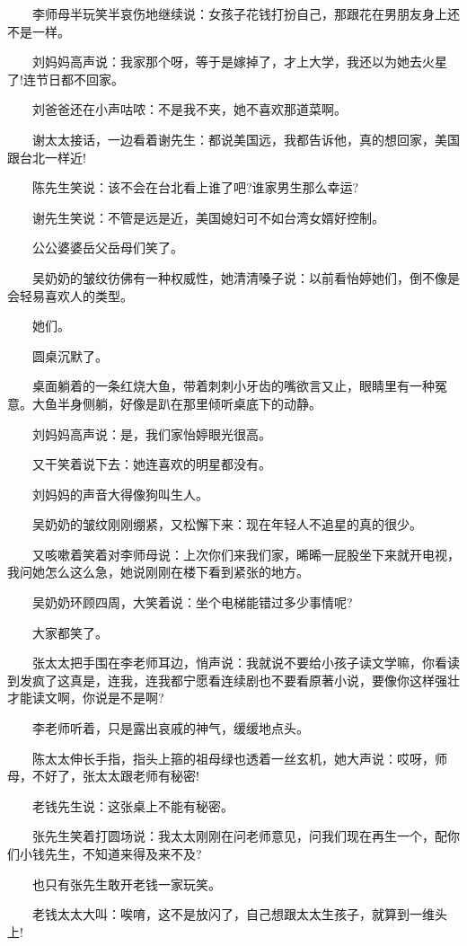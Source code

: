 \documentclass[12pt,UTF8]{ctexbook}
\begin{document}
　　李师母半玩笑半哀伤地继续说：女孩子花钱打扮自己，那跟花在男朋友身上还不是一样。

　　刘妈妈高声说：我家那个呀，等于是嫁掉了，才上大学，我还以为她去火星了!连节日都不回家。

　　刘爸爸还在小声咕哝：不是我不夹，她不喜欢那道菜啊。

　　谢太太接话，一边看着谢先生：都说美国远，我都告诉他，真的想回家，美国跟台北一样近!

　　陈先生笑说：该不会在台北看上谁了吧?谁家男生那么幸运?

　　谢先生笑说：不管是远是近，美国媳妇可不如台湾女婿好控制。

　　公公婆婆岳父岳母们笑了。

　　吴奶奶的皱纹彷佛有一种权威性，她清清嗓子说：以前看怡婷她们，倒不像是会轻易喜欢人的类型。

　　她们。

　　圆桌沉默了。

　　桌面躺着的一条红烧大鱼，带着刺刺小牙齿的嘴欲言又止，眼睛里有一种冤意。大鱼半身侧躺，好像是趴在那里倾听桌底下的动静。

　　刘妈妈高声说：是，我们家怡婷眼光很高。

　　又干笑着说下去：她连喜欢的明星都没有。

　　刘妈妈的声音大得像狗叫生人。

　　吴奶奶的皱纹刚刚绷紧，又松懈下来：现在年轻人不追星的真的很少。

　　又咳嗽着笑着对李师母说：上次你们来我们家，晞晞一屁股坐下来就开电视，我问她怎么这么急，她说刚刚在楼下看到紧张的地方。

　　吴奶奶环顾四周，大笑着说：坐个电梯能错过多少事情呢?

　　大家都笑了。

　　张太太把手围在李老师耳边，悄声说：我就说不要给小孩子读文学嘛，你看读到发疯了这真是，连我，连我都宁愿看连续剧也不要看原著小说，要像你这样强壮才能读文啊，你说是不是啊?

　　李老师听着，只是露出哀戚的神气，缓缓地点头。

　　陈太太伸长手指，指头上箍的祖母绿也透着一丝玄机，她大声说：哎呀，师母，不好了，张太太跟老师有秘密!

　　老钱先生说：这张桌上不能有秘密。

　　张先生笑着打圆场说：我太太刚刚在问老师意见，问我们现在再生一个，配你们小钱先生，不知道来得及来不及?

　　也只有张先生敢开老钱一家玩笑。

　　老钱太太大叫：唉唷，这不是放闪了，自己想跟太太生孩子，就算到一维头上!
\end{document}
